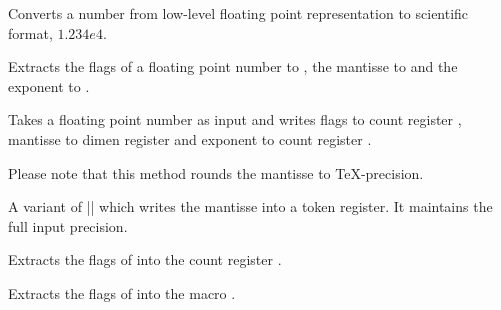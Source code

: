 \begin{command}{\pgfmathfloattosci{}}
	Converts a number from low-level floating point representation to scientific format, $1.234e4$.
\end{command}


\begin{command}{}
	Extracts the flags of a floating point number  to , the mantisse to  and the exponent to .
\end{command}

\begin{command}{}
	Takes a floating point number  as input and writes flags to count
	register , mantisse to dimen register  and exponent to count
	register .

	Please note that this method rounds the mantisse to \TeX-precision.
\end{command}

\begin{command}{}
	A variant of |\pgfmathfloattoregisters| which writes the mantisse into a token register. It maintains the full input precision.
\end{command}

\begin{command}{}
	Extracts the flags of  into the count register .
\end{command}

\begin{command}{}
	Extracts the flags of  into the macro .
\end{command}

